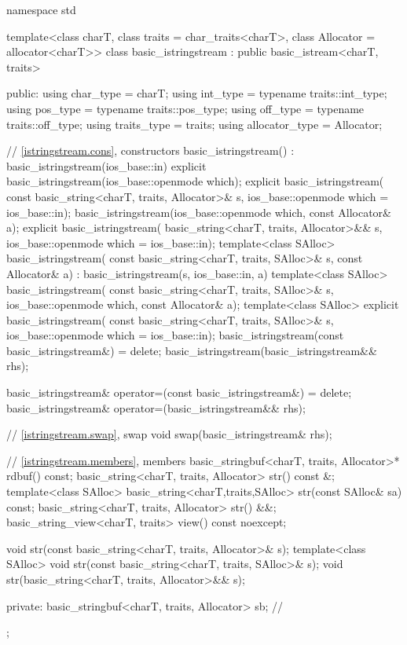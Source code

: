 %
\begin{codeblock}
namespace std {
  template<class charT, class traits = char_traits<charT>,
           class Allocator = allocator<charT>>
  class basic_istringstream : public basic_istream<charT, traits> {
  public:
    using char_type      = charT;
    using int_type       = typename traits::int_type;
    using pos_type       = typename traits::pos_type;
    using off_type       = typename traits::off_type;
    using traits_type    = traits;
    using allocator_type = Allocator;

    // \ref{istringstream.cons}, constructors
    basic_istringstream() : basic_istringstream(ios_base::in) {}
    explicit basic_istringstream(ios_base::openmode which);
    explicit basic_istringstream(
      const basic_string<charT, traits, Allocator>& s,
      ios_base::openmode which = ios_base::in);
    basic_istringstream(ios_base::openmode which, const Allocator& a);
    explicit basic_istringstream(
      basic_string<charT, traits, Allocator>&& s,
      ios_base::openmode which = ios_base::in);
    template<class SAlloc>
      basic_istringstream(
        const basic_string<charT, traits, SAlloc>& s, const Allocator& a)
        : basic_istringstream(s, ios_base::in, a) {}
    template<class SAlloc>
      basic_istringstream(
        const basic_string<charT, traits, SAlloc>& s,
        ios_base::openmode which, const Allocator& a);
    template<class SAlloc>
      explicit basic_istringstream(
        const basic_string<charT, traits, SAlloc>& s,
        ios_base::openmode which = ios_base::in);
    basic_istringstream(const basic_istringstream&) = delete;
    basic_istringstream(basic_istringstream&& rhs);

    basic_istringstream& operator=(const basic_istringstream&) = delete;
    basic_istringstream& operator=(basic_istringstream&& rhs);

    // \ref{istringstream.swap}, swap
    void swap(basic_istringstream& rhs);

    // \ref{istringstream.members}, members
    basic_stringbuf<charT, traits, Allocator>* rdbuf() const;
    basic_string<charT, traits, Allocator> str() const &;
    template<class SAlloc>
      basic_string<charT,traits,SAlloc> str(const SAlloc& sa) const;
    basic_string<charT, traits, Allocator> str() &&;
    basic_string_view<charT, traits> view() const noexcept;

    void str(const basic_string<charT, traits, Allocator>& s);
    template<class SAlloc>
      void str(const basic_string<charT, traits, SAlloc>& s);
    void str(basic_string<charT, traits, Allocator>&& s);

  private:
    basic_stringbuf<charT, traits, Allocator> sb;   // \expos
  };
}
\end{codeblock}

